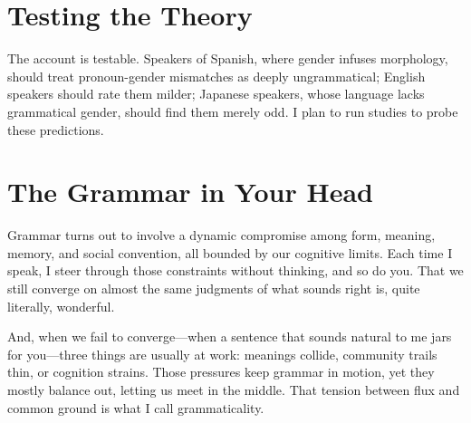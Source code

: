 \documentclass[12pt]{article}
\begin{document}
\section*{Testing the Theory}

The account is testable. Speakers of Spanish, where gender infuses morphology, should treat pronoun-gender mismatches as deeply ungrammatical; English speakers should rate them milder; Japanese speakers, whose language lacks grammatical gender, should find them merely odd. I plan to run studies to probe these predictions.

\section*{The Grammar in Your Head}

Grammar turns out to involve a dynamic compromise among form, meaning, memory, and social convention, all bounded by our cognitive limits. Each time I speak, I steer through those constraints without thinking, and so do you. That we still converge on almost the same judgments of what sounds right is, quite literally, wonderful.

And, when we fail to converge—when a sentence that sounds natural to me jars for you—three things are usually at work: meanings collide, community trails thin, or cognition strains. Those pressures keep grammar in motion, yet they mostly balance out, letting us meet in the middle. That tension between flux and common ground is what I call grammaticality.
\end{document}
